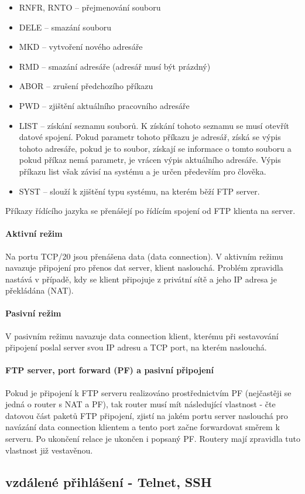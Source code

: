 \documentclass[10pt,a4paper]{article}
\begin{document}
\begin{itemize}
\begin{itemize}
		\item RNFR, RNTO – přejmenování souboru
		\item DELE – smazání souboru
		\item MKD – vytvoření nového adresáře
		\item RMD – smazání adresáře (adresář musí být prázdný)
		\item ABOR – zrušení předchozího příkazu
		\item PWD – zjištění aktuálního pracovního adresáře
		\item LIST – získání seznamu souborů. K získání tohoto seznamu se musí otevřít datové spojení. Pokud parametr tohoto příkazu je adresář, získá se výpis tohoto adresáře, pokud je to soubor, získají se informace o tomto souboru a pokud příkaz nemá parametr, je vrácen výpis aktuálního adresáře. Výpis příkazu list však závisí na systému a je určen především pro člověka.
		\item SYST – slouží k zjištění typu systému, na kterém běží FTP server.
	\end{itemize}
\end{itemize}
Příkazy řídícího jazyka se přenášejí po řídícím spojení od FTP klienta na server.
\paragraph{Aktivní režim} Na portu TCP/20 jsou přenášena data (data connection). V aktivním režimu navazuje připojení pro přenos dat server, klient naslouchá. Problém zpravidla nastává v případě, kdy se klient připojuje z privátní sítě a jeho IP adresa je překládána (NAT).
\paragraph{Pasivní režim} V pasivním režimu navazuje data connection klient, kterému při sestavování připojení poslal server svou IP adresu a TCP port, na kterém naslouchá.
\paragraph{FTP server, port forward (PF) a pasivní připojení} Pokud je připojení k FTP serveru realizováno prostřednictvím PF (nejčastěji se jedná o router s NAT a PF), tak router musí mít následující vlastnost - čte datovou část paketů FTP připojení, zjistí na jakém portu server naslouchá pro navázání data connection klientem a tento port začne forwardovat směrem k serveru. Po ukončení relace je ukončen i popsaný PF. Routery mají zpravidla tuto vlastnost již vestavěnou.

\subsection{vzdálené přihlášení - Telnet, SSH}
\end{document}
